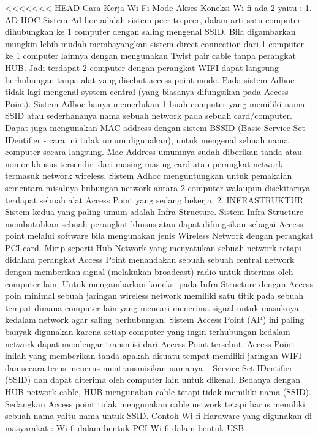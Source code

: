 <<<<<<< HEAD
 Cara Kerja Wi-Fi
 Mode Akses Koneksi Wi-fi ada 2 yaitu :
1. AD-HOC
Sistem Ad-hoc adalah sistem peer to peer, dalam arti satu computer dihubungkan ke 1 computer dengan saling mengenal SSID. Bila digambarkan mungkin lebih mudah membayangkan sistem direct connection dari 1 computer ke 1 computer lainnya dengan mengunakan Twist pair cable tanpa perangkat HUB. Jadi terdapat 2 computer dengan perangkat WIFI dapat langsung berhubungan tanpa alat yang disebut access point mode. Pada sistem Adhoc tidak lagi mengenal system central (yang biasanya difungsikan pada Access Point). Sistem Adhoc hanya memerlukan 1 buah computer yang memiliki nama SSID atau sederhananya nama sebuah network pada sebuah card/computer. Dapat juga mengunakan MAC address dengan sistem BSSID (Basic Service Set IDentifier - cara ini tidak umum digunakan), untuk mengenal sebuah nama computer secara langsung. Mac Address umumnya sudah diberikan tanda atau nomor khusus tersendiri dari masing masing card atau 
perangkat network termasuk network wireless. Sistem Adhoc menguntungkan untuk pemakaian sementara misalnya hubungan network antara 2 computer walaupun disekitarnya terdapat sebuah alat Access Point yang sedang bekerja.
2. INFRASTRUKTUR
Sistem kedua yang paling umum adalah Infra Structure. Sistem Infra Structure membutuhkan sebuah perangkat khusus atau dapat difungsikan sebagai Access point melalui software bila mengunakan jenis Wireless Network dengan perangkat PCI card. Mirip seperti Hub Network yang menyatukan sebuah network tetapi didalam perangkat Access Point menandakan sebuah sebuah central network dengan memberikan signal (melakukan broadcast) radio untuk diterima oleh computer lain. Untuk mengambarkan koneksi pada Infra Structure dengan Access poin minimal sebuah jaringan wireless network memiliki satu titik pada sebuah tempat dimana computer lain yang mencari menerima signal untuk masuknya kedalam network agar saling berhubungan. Sistem Access Point (AP) ini  paling banyak digunakan karena setiap computer yang ingin terhubungan kedalam network dapat mendengar transmisi dari Access Point tersebut. Access Point inilah yang memberikan
 tanda apakah disuatu tempat memiliki jaringan WIFI dan secara terus menerus mentransmisikan namanya – Service Set IDentifier (SSID) dan dapat diterima oleh computer lain untuk dikenal. Bedanya dengan HUB network cable, HUB mengunakan cable tetapi tidak memiliki nama (SSID). Sedangkan Access point tidak mengunakan cable network tetapi harus memiliki sebuah nama yaitu nama untuk SSID. Contoh Wi-fi Hardware yang digunakan di masyarakat : Wi-fi dalam bentuk PCI Wi-fi dalam bentuk USB



